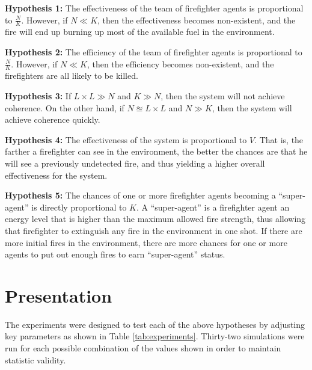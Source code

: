 \documentclass{article}
\begin{document}
  \begin{description}

  \item \textbf{Hypothesis 1:}
    The effectiveness of the team of firefighter agents is proportional to
    $\frac{N}{K}$.  However, if $N \ll K$, then the effectiveness becomes
    non-existent, and the fire will end up burning up most of the available
    fuel in the environment.

  \item \textbf{Hypothesis 2:}
    The efficiency of the team of firefighter agents is proportional to
    $\frac{N}{K}$.  However, if $N \ll K$, then the efficiency becomes
    non-existent, and the firefighters are all likely to be killed.

  \item \textbf{Hypothesis 3:}
    If $L \times L \gg N$ and $K \gg N$, then the system will not achieve
    coherence.  On the other hand, if $N \approxeq L \times L$ and $N \gg K$,
    then the system will achieve coherence quickly.

  \item \textbf{Hypothesis 4:}
    The effectiveness of the system is proportional to $V$.  That is,
    the farther a firefighter can see in the environment, the better the
    chances are that he will see a previously undetected fire, and thus
    yielding a higher overall effectiveness for the system.

  \item \textbf{Hypothesis 5:}
    The chances of one or more firefighter agents becoming a ``super-agent''
    is directly proportional to $K$.  A ``super-agent'' is a firefighter agent
    an energy level that is higher than the maximum allowed fire strength, thus
    allowing that firefighter to extinguish any fire in the environment in one shot.
    If there are more initial fires in the environment, there are more chances
    for one or more agents to put out enough fires to earn ``super-agent''
    status.

  \end{description}

\section{Presentation}

  The experiments were designed to test each of the above hypotheses by
  adjusting key parameters as shown in Table \ref{tab:experiments}. 
  Thirty-two simulations were run for each possible combination of the
  values shown in order to maintain statistic validity.
\end{document}
